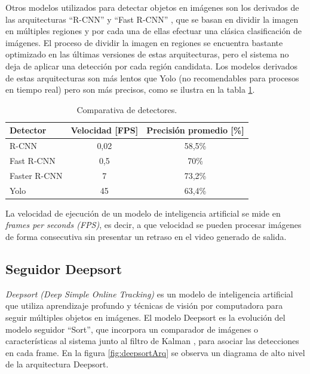 
\newpage

Otros modelos utilizados para detectar objetos en imágenes son los derivados de las arquitecturas ``R-CNN'' y ``Fast R-CNN'' \citep{RCNN}, que se basan en dividir la imagen en múltiples regiones y por cada una de ellas efectuar una clásica clasificación de imágenes. El proceso de dividir la imagen en regiones se encuentra bastante optimizado en las últimas versiones de estas arquitecturas, pero el sistema no deja de aplicar una detección por cada región candidata. Los modelos derivados de estas arquitecturas son más lentos que Yolo (no recomendables para procesos en tiempo real) pero son más precisos, como se ilustra en la tabla \ref{tab:comparativaDetectores}.

\begin{table}[h]
	\centering
	\caption[Comparativa de detectores]{Comparativa de detectores.}
	\begin{tabular}{l c c}    
		\toprule
		\textbf{Detector}   & \textbf{Velocidad [FPS]} & \textbf{Precisión promedio [\%]} \\
		\midrule
		R-CNN & 0,02 & 58,5\% \\
		Fast R-CNN & 0,5 & 70\% \\
		Faster R-CNN & 7 & 73,2\% \\
		Yolo & 45 & 63,4\% \\
		\bottomrule
		\hline
	\end{tabular}
	\label{tab:comparativaDetectores}
\end{table}

La velocidad de ejecución de un modelo de inteligencia artificial se mide en \textit{frames per seconds (FPS)}, es decir, a que velocidad se pueden procesar imágenes de forma consecutiva sin presentar un retraso en el video generado de salida.

\subsection{Seguidor Deepsort}

\textit{Deepsort (Deep Simple Online Tracking)} es un modelo de inteligencia artificial que utiliza aprendizaje profundo y técnicas de visión por computadora para seguir múltiples objetos en imágenes. El modelo Deepsort es la evolución del modelo seguidor ``Sort'', que incorpora un comparador de imágenes o características al sistema junto al filtro de Kalman \citep{KALMAN_FILTER}, para asociar las detecciones en cada frame. En la figura \ref{fig:deepsortArq} se observa un diagrama de alto nivel de la arquitectura Deepsort.

